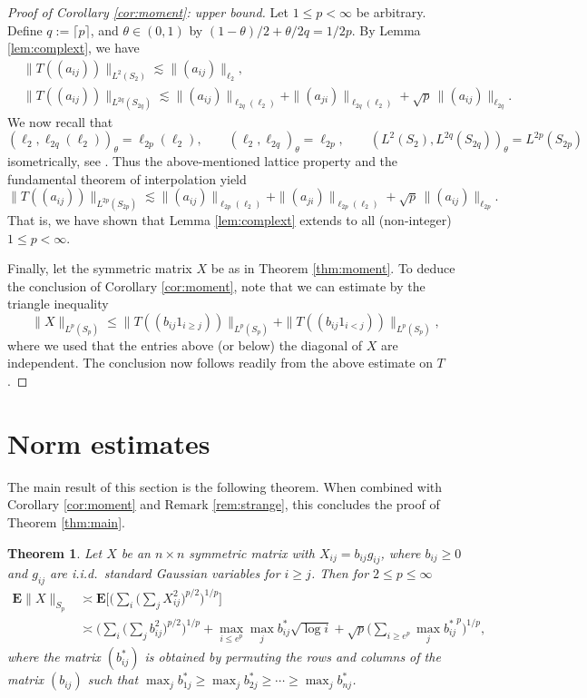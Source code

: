 \documentclass[10pt,reqno]{amsart}
\newtheorem{thm}{Theorem}[section]
\theoremstyle{definition}
\numberwithin{equation}{section}
\numberwithin{figure}{section}
\numberwithin{table}{section}
\begin{document}
\begin{proof}[Proof of Corollary \ref{cor:moment}: upper bound]
Let $1\le p<\infty$ be arbitrary. Define $q:=\lceil p\rceil$, and
$\theta\in(0,1)$ by $(1-\theta)/2 + \theta/2q = 1/2p$. By Lemma 
\ref{lem:complext}, we have
\begin{align*}
&	\|T((a_{ij}))\|_{L^{2}(S_{2})} \lesssim
	\|(a_{ij})\|_{\ell_2}, \\
&	\|T((a_{ij}))\|_{L^{2q}(S_{2q})} \lesssim
	\|(a_{ij})\|_{\ell_{2q}(\ell_2)} +
	\|(a_{ji})\|_{\ell_{2q}(\ell_2)} + \sqrt{p}\,\|(a_{ij})\|_{\ell_{2q}}.
\end{align*}
We now recall that
$$
	(\ell_2,\ell_{2q}(\ell_2))_\theta= \ell_{2p}(\ell_2),\qquad
	(\ell_2,\ell_{2q})_\theta=\ell_{2p},\qquad
	(L^2(S_2),L^{2q}(S_{2q}))_\theta=L^{2p}(S_{2p})
$$
isometrically, see \cite[Theorem 8.21 and (14.3)]{Pis16}. Thus the 
above-mentioned lattice property \cite{Mal87} and the fundamental
theorem of interpolation \cite[Theorem 8.8]{Pis16} yield
$$
	\|T((a_{ij}))\|_{L^{2p}(S_{2p})} \lesssim
	\|(a_{ij})\|_{\ell_{2p}(\ell_2)} +
	\|(a_{ji})\|_{\ell_{2p}(\ell_2)} + \sqrt{p}\,\|(a_{ij})\|_{\ell_{2p}}.
$$
That is, we have shown that Lemma \ref{lem:complext} extends to all
(non-integer) $1\le p<\infty$.

Finally, let the symmetric matrix $X$ be as in Theorem \ref{thm:moment}.
To deduce the conclusion of Corollary \ref{cor:moment}, note that we can 
estimate by the triangle inequality
$$
	\|X\|_{L^p(S_p)} \le
	\|T((b_{ij}1_{i\ge j}))\|_{L^p(S_p)} +
	\|T((b_{ij}1_{i<j}))\|_{L^p(S_p)},
$$
where we used that the entries above (or below) the diagonal of $X$ are 
independent. The conclusion now follows readily from the above estimate
on $T$.
\end{proof}


\section{Norm estimates}
\label{sec:norm}

The main result of this section is the following theorem. When combined 
with Corollary \ref{cor:moment} and Remark \ref{rem:strange}, this 
concludes the proof of Theorem \ref{thm:main}.

\begin{thm}
\label{thm:schatten}
Let $X$ be an $n\times n$ symmetric matrix with 
$X_{ij}=b_{ij}g_{ij}$, where $b_{ij}\ge 0$ and $g_{ij}$ are i.i.d.\ 
standard Gaussian variables for $i\ge j$. Then for $2\le p\le\infty$
\begin{align*}
	\mathbf{E}\|X\|_{S_p} &\asymp
	\mathbf{E}\Bigg[
	\Bigg(\sum_i\Bigg(\sum_j X_{ij}^2\Bigg)^{p/2}\Bigg)^{1/p}
	\Bigg] 
	\\
	&\asymp
	\Bigg(\sum_i\Bigg(\sum_j b_{ij}^2\Bigg)^{p/2}\Bigg)^{1/p} +
	\max_{i\le e^p}\max_j b_{ij}^*\sqrt{\log i} +
	\sqrt{p}\Bigg(
	\sum_{i\ge e^p}\max_j {b_{ij}^{*}}^p
	\Bigg)^{1/p},
\end{align*}
where the matrix $(b_{ij}^*)$ is obtained by permuting the rows and 
columns of the matrix $(b_{ij})$ such that
$\max_j b_{1j}^* \ge \max_j b_{2j}^* \ge \cdots \ge \max_j b_{nj}^*$.
\end{thm}
\end{document}
